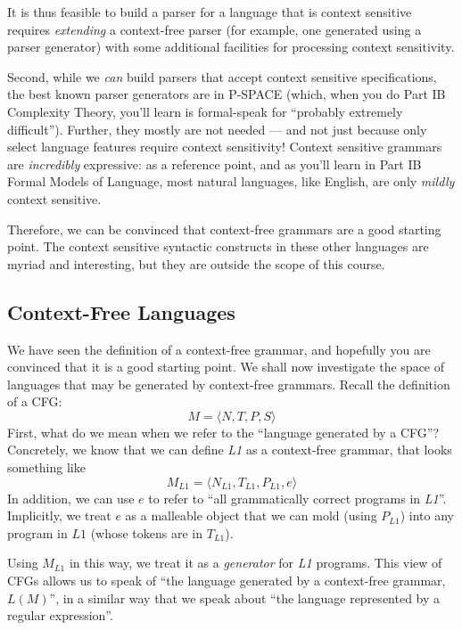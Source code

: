 It is thus feasible to build a parser for a language that is context sensitive requires \textit{extending} a context-free parser (for example, one generated using a parser generator) with some additional facilities for processing context sensitivity. 

Second, while we \textit{can} build parsers that accept context sensitive specifications, the best known parser generators are in \textsf{P-SPACE} (which, when you do \textsf{Part IB Complexity Theory}, you'll learn is formal-speak for ``probably extremely difficult''). Further, they mostly are not needed --- and not just because only select language features require context sensitivity! Context sensitive grammars are \textit{incredibly} expressive: as a reference point, and as you'll learn in \textsf{Part IB Formal Models of Language}, most natural languages, like English, are only \textit{mildly} context sensitive.

Therefore, we can be convinced that context-free grammars are a good starting point. The context sensitive syntactic constructs in these other languages are myriad and interesting, but they are outside the scope of this course.

\subsection{Context-Free Languages}\label{section:cfg-properties}
We have seen the definition of a context-free grammar, and hopefully you are convinced that it is a good starting point. We shall now investigate the space of languages that may be generated by context-free grammars. Recall the definition of a CFG:
\[ M = \langle N, T, P, S \rangle \]
First, what do we mean when we refer to the ``language generated by a CFG''? Concretely, we know that we can define \textit{L1} as a context-free grammar, that looks something like
\[ M_{\textit{L1}} = \langle N_{\textit{L1}}, T_{\textit{L1}}, P_{\textit{L1}}, e \rangle \]
In addition, we can use $e$ to refer to ``all grammatically correct programs in \textit{L1}''. Implicitly, we treat $e$ as a malleable object that we can mold (using $P_{\textit{L1}}$) into any program in $L1$ (whose tokens are in $T_{\textit{L1}}$). 

Using $M_\textit{L1}$ in this way, we treat it as a \textit{generator} for \textit{L1} programs. This view of CFGs allows us to speak of ``the language generated by a context-free grammar, $L(M)$'', in a similar way that we speak about ``the language represented by a regular expression''.

